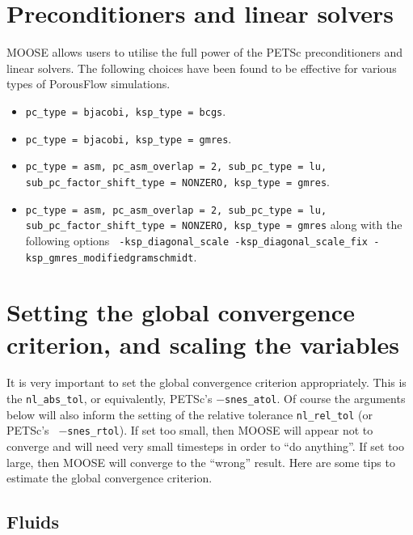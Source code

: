 \documentclass[12pt]{report}
\begin{document}
\section{Preconditioners and linear solvers}

MOOSE allows users to utilise the full power of the PETSc
preconditioners and linear solvers.  The following choices have been
found to be effective for various types of PorousFlow simulations.
\begin{itemize}
\item {\tt pc\_type = bjacobi, ksp\_type = bcgs}.
\item {\tt pc\_type = bjacobi, ksp\_type = gmres}.
\item {\tt pc\_type = asm, pc\_asm\_overlap = 2, sub\_pc\_type = lu,
  sub\_pc\_factor\_shift\_type = NONZERO, 
  ksp\_type = gmres}.
\item {\tt pc\_type = asm, pc\_asm\_overlap = 2, sub\_pc\_type = lu,
  sub\_pc\_factor\_shift\_type = NONZERO, 
  ksp\_type = gmres} along with the following options {\tt
  -ksp\_diagonal\_scale -ksp\_diagonal\_scale\_fix
  -ksp\_gmres\_modifiedgramschmidt}.
\end{itemize}

\section{Setting the global convergence criterion, and scaling the variables}

It is very important to set the global convergence criterion
appropriately.  This is the {\tt nl\_abs\_tol}, or equivalently,
PETSc's {\tt $-$snes\_atol}.  Of course the arguments below will also
inform the setting of the relative tolerance {\tt nl\_rel\_tol} (or PETSc's {\tt
  $-$snes\_rtol}).  If set too small, then MOOSE will appear not to
converge and will need very small timesteps in order to ``do
anything''.  If set too large, then MOOSE will converge to the
``wrong'' result.  Here are some tips to estimate the global convergence
criterion.

\subsection{Fluids}
\end{document}
